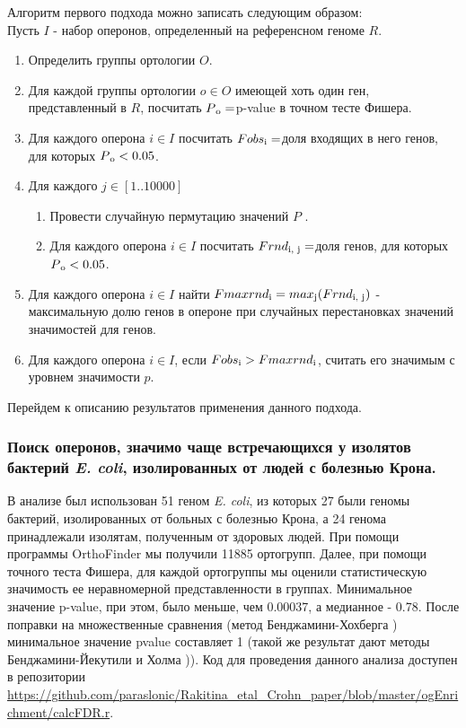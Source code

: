 Алгоритм первого подхода можно записать следующим образом:\\
Пусть $I$ - набор оперонов, определенный на референсном геноме $R$.
\begin{enumerate} 
  \item Определить группы ортологии $O$.
  \item Для каждой группы ортологии $o \in O $ имеющей хоть один ген, представленный в $R$, посчитать $P\textsubscript{o} = $p-value в точном тесте Фишера.
  \item Для каждого оперона $i \in I$ посчитать $Fobs\textsubscript{i} = $доля входящих в него генов, для которых $P\textsubscript{o} < 0.05$.
  \item Для каждого $j \in [1..10000]$
  	\begin{enumerate} 
        \item Провести случайную пермутацию значений $P$ .
        \item Для каждого оперона $i \in I$ посчитать $Frnd\textsubscript{i, j} = $доля генов, для которых $P\textsubscript{o} < 0.05$.
  	\end{enumerate} 
  \item Для каждого оперона $i \in I$ найти $Fmaxrnd\textsubscript{i}=max\textsubscript{j}(Frnd\textsubscript{i, j})$ - максимальную долю генов в опероне при случайных перестановках значений значимостей для генов.
  \item Для каждого оперона $i \in I$, если $Fobs\textsubscript{i}>Fmaxrnd\textsubscript{i}$, считать его значимым с уровнем значимости $p{}$.
\end{enumerate}

Перейдем к описанию результатов применения данного подхода.

\subsubsection{Поиск оперонов, значимо чаще встречающихся у изолятов бактерий \textit{E. coli}, изолированных от людей с болезнью Крона.}
В анализе был использован 51 геном \textit{E. coli}, из которых 27 были геномы бактерий, изолированных от больных с болезнью Крона, а 24 генома принадлежали изолятам, полученным от здоровых людей. При помощи программы OrthoFinder \cite{emms2015orthofinder} мы получили 11885 ортогрупп. Далее, при помощи точного теста Фишера, для каждой ортогруппы мы оценили статистическую значимость ее неравномерной представленности в группах. Минимальное значение p-value, при этом, было меньше, чем 0.00037, а медианное - 0.78. После поправки на множественные сравнения (метод Бенджамини-Хохберга \cite{benjamini1995controlling}) минимальное значение p\-value составляет 1 (такой же результат дают методы Бенджамини-Йекутили \cite{benjamini2001control} и Холма \cite{holm1979simple})). Код для проведения данного анализа доступен в репозитории \url{https://github.com/paraslonic/Rakitina_etal_Crohn_paper/blob/master/ogEnrichment/calcFDR.r}. 

